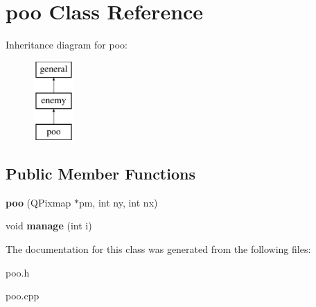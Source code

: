 \hypertarget{classpoo}{\section{poo \-Class \-Reference}
\label{classpoo}
}
\-Inheritance diagram for poo\-:\begin{figure}[H]
\begin{center}
\leavevmode
\includegraphics[height=3.000000cm]{classpoo}
\end{center}
\end{figure}
\subsection*{\-Public \-Member \-Functions}
\begin{DoxyCompactItemize}
\item 
\hypertarget{classpoo_afe4c32e7b77b09fa7e7834a275f860bf}{{\bfseries poo} (\-Q\-Pixmap $\ast$pm, int ny, int nx)}\label{classpoo_afe4c32e7b77b09fa7e7834a275f860bf}

\item 
\hypertarget{classpoo_ae03c4d2028b2c80a75b7f5f97acb3fd0}{void {\bfseries manage} (int i)}\label{classpoo_ae03c4d2028b2c80a75b7f5f97acb3fd0}

\end{DoxyCompactItemize}


\-The documentation for this class was generated from the following files\-:\begin{DoxyCompactItemize}
\item 
poo.\-h\item 
poo.\-cpp\end{DoxyCompactItemize}
